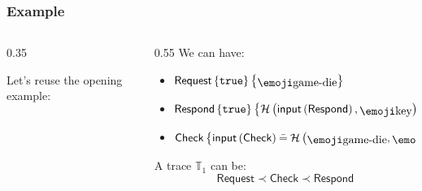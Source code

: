 \documentclass[aspectratio=169]{beamer}
\begin{document}
\begin{frame}
  \frametitle{Example}
  \begin{columns}
    \begin{column}{0.35\textwidth}


      Let's reuse the opening example:
      \begin{center}
      \end{center}\pause
    \end{column}

    \begin{column}{0.55\textwidth}
      {\RajdhaniSb We can have}:\pause
      \begin{itemize}[<+->]
        \item $\mathsf{Request}\left\{ \btop \right\}\left\{ \mdice \right\}$
        \item $\mathsf{Respond}\left\{ \btop \right\}\left\{ \mathcal{H}\left( \mathsf{input}\left( \mathsf{Respond} \right), \mkey \right) \right\}$
        \item $\mathsf{Check}\left\{ \mathsf{input}\left(\mathsf{Check}\right) \beq \mathcal{H}\left( \mdice, \mkey \right) \right\}\left\{ \text{ok} \right\}$
      \end{itemize}\pause

      {\RajdhaniSb A trace $\mathbb{T}_1$ can be}:
      \[
        \mathsf{Request} \prec \mathsf{Check} \prec \mathsf{Respond}
      \]
    \end{column}
  \end{columns}

\end{frame}
\end{document}
